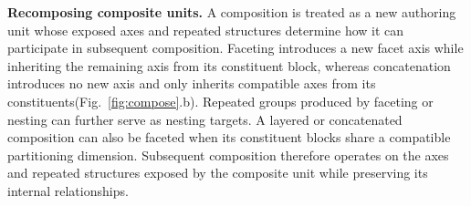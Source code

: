 \textbf{Recomposing composite units.}
A composition is treated as a new authoring unit whose exposed axes and
repeated structures determine how it can participate in subsequent
composition. Faceting introduces a new facet axis
while inheriting the remaining axis from its constituent block, whereas
concatenation introduces no new axis and only inherits compatible axes from
its constituents(Fig.~\ref{fig:compose}.b). Repeated groups produced by faceting or nesting can further
serve as nesting targets. A layered or concatenated composition can also be
faceted when its constituent blocks share a compatible partitioning
dimension. Subsequent composition therefore operates on the axes and repeated
structures exposed by the composite unit while preserving its internal
relationships.













